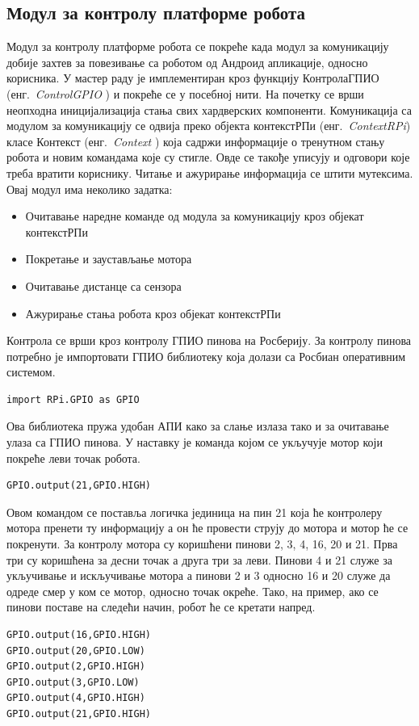 \documentclass[12pt,oneside]{memoir}
\theoremstyle{remark}
\begin{document}
\subsection{Модул за контролу платформе робота}
Модул за контролу платформе робота се покреће када модул за комуникацију добије захтев за повезивање са роботом од Андроид апликације, односно корисника. 
У мастер раду је имплементиран кроз функцију КонтролаГПИО (енг.~{\em ControlGPIO }) и покреће се у посебној нити. На почетку се врши неопходна иницијализација стања свих хардверских компоненти. Комуникација са модулом за комуникацију се одвија преко објекта контекстРПи (енг.~{\em ContextRPi})  класе Контекст (енг.~{\em Context }) која садржи информације о тренутном стању робота и новим командама које су стигле. Овде се такође уписују и одговори које треба вратити кориснику. Читање и ажурирање информација се штити мутексима.
Овај модул има неколико задатка:
\begin{itemize}
\item Очитавање наредне команде од модула за комуникацију кроз објекат контекстРПи
\item Покретање и заустављање мотора
\item Очитавање дистанце са сензора
\item Ажурирање стања робота кроз објекат контекстРПи
\end{itemize}

Контрола се врши кроз контролу ГПИО пинова на Росберију. За контролу пинова потребно је импортовати ГПИО библиотеку која долази са Росбиан оперативним системом.
\begin{lstlisting}
import RPi.GPIO as GPIO
\end{lstlisting}
Ова библиотека пружа удобан АПИ како за слање излаза тако и за очитавање улаза са ГПИО пинова. У наставку је команда којом се укључује мотор који покреће леви точак робота.
\begin{lstlisting}
GPIO.output(21,GPIO.HIGH)
\end{lstlisting}

Овом командом се поставља логичка јединица на пин 21 која ће контролеру мотора пренети ту информацију а он ће провести струју до мотора и мотор ће се покренути.
За контролу мотора су коришћени пинови 2, 3, 4, 16, 20 и 21. Прва три су коришћена за десни точак а друга три за леви. Пинови 4 и 21 служе за укључивање и искључивање мотора а пинови 2 и 3 односно  16 и 20 служе да одреде смер у ком се мотор, односно точак окреће. Тако, на пример, ако се пинови поставе на следећи начин, робот ће се кретати напред.
\begin{lstlisting}
GPIO.output(16,GPIO.HIGH)
GPIO.output(20,GPIO.LOW)
GPIO.output(2,GPIO.HIGH)
GPIO.output(3,GPIO.LOW)
GPIO.output(4,GPIO.HIGH)
GPIO.output(21,GPIO.HIGH)
\end{lstlisting}
\end{document}
